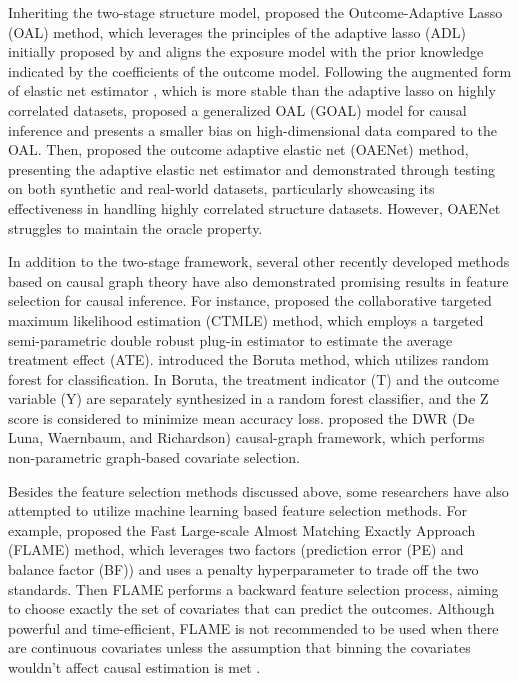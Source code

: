 Inheriting the two-stage structure model, \cite{shortreed2017outcome} proposed the Outcome-Adaptive Lasso (OAL) method, which leverages the principles of the adaptive lasso (ADL) initially proposed by \cite{zou2005regularization} and aligns the exposure model with the prior knowledge indicated by the coefficients of the outcome model. Following the augmented form of elastic net estimator \citep{zou2006adaptive}, which is more stable than the adaptive lasso on highly correlated datasets, \cite{balde2022reader} proposed a generalized OAL (GOAL) model for causal inference and presents a smaller bias on high-dimensional data compared to the OAL. Then, \cite{islam2021feature} proposed the outcome adaptive elastic net (OAENet) method, presenting the adaptive elastic net estimator and demonstrated through testing on both synthetic and real-world datasets, particularly showcasing its effectiveness in handling highly correlated structure datasets. However, OAENet struggles to maintain the oracle property.

In addition to the two-stage framework, several other recently developed methods based on causal graph theory have also demonstrated promising results in feature selection for causal inference. For instance, \cite{gruber2010application} proposed the collaborative targeted maximum likelihood estimation (CTMLE) method, which employs a targeted semi-parametric double robust plug-in estimator to estimate the average treatment effect (ATE). \cite{kursa2010boruta} introduced the Boruta method, which utilizes random forest for classification. In Boruta, the treatment indicator (T) and the outcome variable (Y) are separately synthesized in a random forest classifier, and the Z score is considered to minimize mean accuracy loss. \cite{de2011covariate} proposed the DWR (De Luna, Waernbaum, and Richardson) causal-graph framework, which performs non-parametric graph-based covariate selection.

Besides the feature selection methods discussed above, some researchers have also attempted to utilize machine learning based feature selection methods. For example, \cite{wang2021flame} proposed the Fast Large-scale Almost Matching Exactly Approach (FLAME) method, which leverages two factors (prediction error (PE) and balance factor (BF)) and uses a penalty hyperparameter to trade off the two standards. Then FLAME performs a backward feature selection process, aiming to choose exactly the set of covariates that can predict the outcomes. Although powerful and time-efficient, FLAME is not recommended to be used when there are continuous covariates unless the assumption that binning the covariates wouldn't affect causal estimation is met \citep{wang2021flame}.

